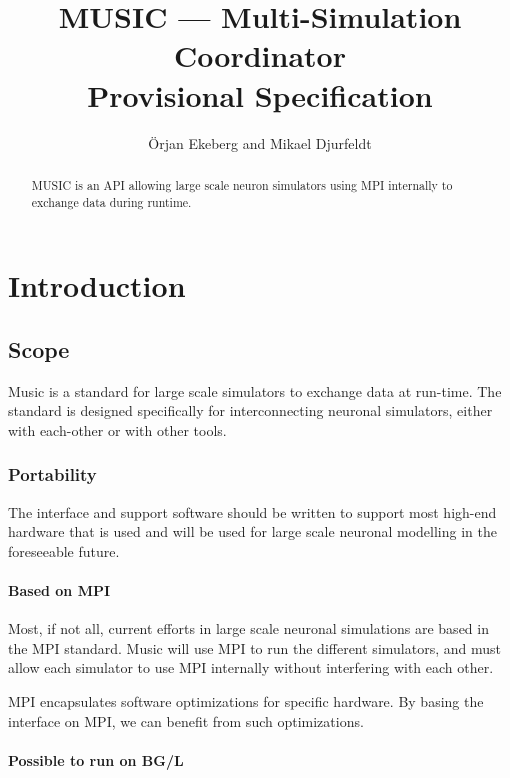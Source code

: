 \documentclass[a4paper]{report}
\title{MUSIC --- Multi-Simulation Coordinator\\Provisional
  Specification}
\author{Örjan Ekeberg and Mikael Djurfeldt}
\begin{document}
\maketitle

\begin{abstract}
  MUSIC is an API allowing large scale neuron simulators using MPI
  internally to exchange data during runtime.
\end{abstract}


\tableofcontents

\chapter{Introduction}

\section{Scope}

Music is a standard for large scale simulators to exchange data at
run-time.  The standard is designed specifically for interconnecting
neuronal simulators, either with each-other or with other tools.


\subsection{Portability}

The interface and support software should be written to support most
high-end hardware that is used and will be used for large scale
neuronal modelling in the foreseeable future.


\subsubsection{Based on MPI}

Most, if not all, current efforts in large scale neuronal simulations
are based in the MPI standard.  Music will use MPI to run the
different simulators, and must allow each simulator to use MPI
internally without interfering with each other.

MPI encapsulates software optimizations for specific hardware.  By
basing the interface on MPI, we can benefit from such optimizations.


\subsubsection{Possible to run on BG/L}
\end{document}
